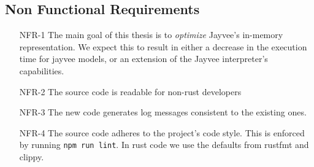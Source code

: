 %



\subsection{Non Functional Requirements}
\label{subsection:NonFunctionalRequirements}

\begin{enumerate}
	\item[NFR-1] The main goal of this thesis is to \emph{optimize} Jayvee's in-memory representation.
	      We expect this to result in either a decrease in the execution time for jayvee models, or an extension of the Jayvee interpreter's capabilities.
	\item[NFR-2] The source code is readable for non-rust developers
	\item[NFR-3] The new code generates log messages consistent to the existing ones.
	\item[NFR-4] The source code adheres to the project's code style.
	      This is enforced by running \Verb|npm run lint|.
	      In rust code we use the defaults from rustfmt and clippy.
\end{enumerate}

